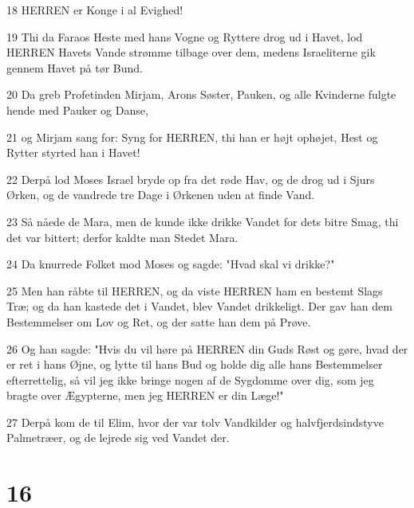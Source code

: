 \par 18 HERREN er Konge i al Evighed!
\par 19 Thi da Faraos Heste med hans Vogne og Ryttere drog ud i Havet, lod HERREN Havets Vande strømme tilbage over dem, medens Israeliterne gik gennem Havet på tør Bund.
\par 20 Da greb Profetinden Mirjam, Arons Søster, Pauken, og alle Kvinderne fulgte hende med Pauker og Danse,
\par 21 og Mirjam sang for: Syng for HERREN, thi han er højt ophøjet, Hest og Rytter styrted han i Havet!
\par 22 Derpå lod Moses Israel bryde op fra det røde Hav, og de drog ud i Sjurs Ørken, og de vandrede tre Dage i Ørkenen uden at finde Vand.
\par 23 Så nåede de Mara, men de kunde ikke drikke Vandet for dets bitre Smag, thi det var bittert; derfor kaldte man Stedet Mara.
\par 24 Da knurrede Folket mod Moses og sagde: "Hvad skal vi drikke?"
\par 25 Men han råbte til HERREN, og da viste HERREN ham en bestemt Slags Træ; og da han kastede det i Vandet, blev Vandet drikkeligt. Der gav han dem Bestemmelser om Lov og Ret, og der satte han dem på Prøve.
\par 26 Og han sagde: "Hvis du vil høre på HERREN din Guds Røst og gøre, hvad der er ret i hans Øjne, og lytte til hans Bud og holde dig alle hans Bestemmelser efterrettelig, så vil jeg ikke bringe nogen af de Sygdomme over dig, som jeg bragte over Ægypterne, men jeg HERREN er din Læge!"
\par 27 Derpå kom de til Elim, hvor der var tolv Vandkilder og halvfjerdsindstyve Palmetræer, og de lejrede sig ved Vandet der.

\chapter{16}

